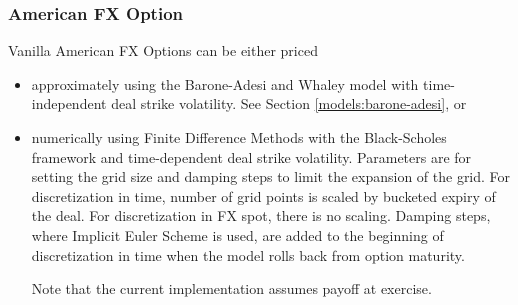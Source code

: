 \subsubsection{American FX Option}
\label{pricing:fx_americanoption}

Vanilla American FX Options can be either priced
\begin{itemize}
\item approximately using the Barone-Adesi and Whaley model with
time-independent deal strike volatility. See Section \ref{models:barone-adesi}, or
\item numerically using Finite Difference Methods with the Black-Scholes
framework and time-dependent deal strike volatility. Parameters are for setting
the grid size and damping steps to limit the expansion of the grid.
For discretization in time, number of grid points is scaled by bucketed expiry of the deal.
For discretization in FX spot, there is no scaling.
Damping steps, where Implicit Euler Scheme is used, are added to the beginning
of discretization in time when the model rolls back from option maturity.

Note that the current implementation assumes payoff at exercise.
\end{itemize}

